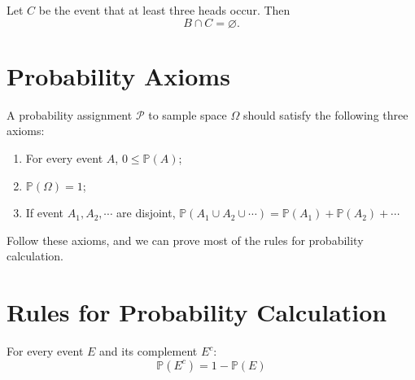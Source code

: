 Let \(C\) be the event that at least three heads occur. Then 
\[
    B \cap C = \varnothing.
\]
\newpage

\section{Probability Axioms}

\begin{definition}
    A probability assignment \(\mathcal{P}\) to sample space \(\Omega\) should satisfy the following three axioms:
    \begin{enumerate}
        \item For every event \(A\), \(0 \leq \mathbb{P}(A)\); 
        \item \(\mathbb{P}(\Omega) = 1\); 
        \item If event \(A_1, A_2, \cdots\) are disjoint, \(\mathbb{P}(A_1 \cup A_2 \cup \cdots) = \mathbb{P}(A_1) + \mathbb{P}(A_2) + \cdots\)
    \end{enumerate}
\end{definition}

Follow these axioms, and we can prove most of the rules for probability calculation.

\section{Rules for Probability Calculation}

\begin{proposition}
    For every event \(E\) and its complement \(E^c\):
    \[
        \mathbb{P}(E^c) = 1 - \mathbb{P}(E)
    \]
\end{proposition}

